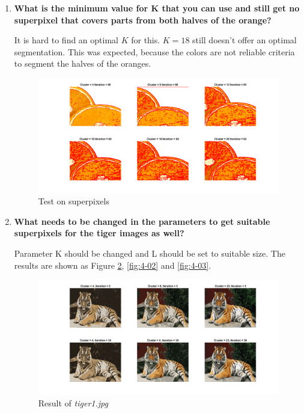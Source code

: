 \documentclass{article}
\begin{document}
\begin{enumerate}
    \item %
    \textbf{What is the minimum value for K that you can use and still get no superpixel that covers parts from both halves of the orange?}
    \par
    
    It is hard to find an optimal $K$ for this. $K = 18$ still doesn't offer an optimal segmentation. This was expected, because the colors are not reliable criteria to segment the halves of the oranges.
    \begin{figure}[H]
        \centering
        \includegraphics[width=1.2\linewidth]{superpixel.png}
        \caption{Test on superpixels}
        \label{fig:3}
    \end{figure}
    
    \item %
    \textbf{What needs to be changed in the parameters to get suitable superpixels for the tiger images as well?}
    \par
    Parameter K should be changed and L should be set to suitable size.
    The results are shown as Figure \ref{fig:4-01}, \ref{fig:4-02} and \ref{fig:4-03}.

    \begin{figure}[H]
        \centering
        \includegraphics[width=\linewidth]{kmeans_para1.png}
        \caption{Result of  \textit{tiger1.jpg}}
        \label{fig:4-01}
    \end{figure}


\end{enumerate}
\end{document}
